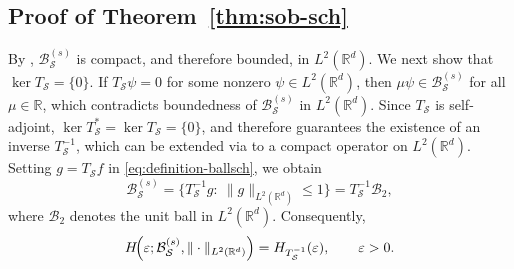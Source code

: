 \documentclass[a4paper,12pt]{article}
\let\originalleft\left
\let\originalright\right
\renewcommand{\left}{\mathopen{}\mathclose\bgroup\originalleft}
\renewcommand{\right}{\aftergroup\egroup\originalright}
\newcommand{\R}{\mathbb{R}}
\newcommand{\diff}{\mathop{}\!d}
\newcommand{\ballsch}{\mathcal{B}^{(s)}_{\mathcal{S}}}
\newcommand{\tsch}{T_{\mathcal{S}}}
\newcommand{\symbolnot}{\sigma}
\begin{document}




\subsection{Proof of Theorem~\ref{thm:sob-sch}}\label{sec:proof-thm-sob-sch}

By \cite[Proposition~25.4]{shubin_pseudodifferential_2001}, $\ballsch$ is compact,
and therefore bounded, in $L^2(\mathbb R^d)$.
We next show that $\ker \tsch=\{0\}$.
If $\tsch\psi=0$ for some nonzero $\psi\in L^2(\R^d)$, then
$\mu\psi\in\ballsch$ for all $\mu\in\R$, which contradicts boundedness of
$\ballsch$ in $L^2(\R^d)$.
Since $\tsch$ is self-adjoint, $\ker \tsch^*=\ker \tsch=\{0\}$, and
\cite[Theorem~25.4]{shubin_pseudodifferential_2001} therefore guarantees the
existence of an inverse $\tsch^{-1}$,
which can be extended via \cite[Theorem~24.4]{shubin_pseudodifferential_2001} to a compact operator 
on 
$L^2(\mathbb R^d)$.
Setting $g=\tsch f$ in \eqref{eq:definition-ballsch}, we obtain
\[
\ballsch
=
\{\tsch^{-1}g:\ \|g\|_{L^2(\mathbb R^d)}\le1\}
=
\tsch^{-1}\mathcal B_2,
\]
where $\mathcal B_2$ denotes the unit ball in $L^2(\mathbb R^d)$.
Consequently,
\begin{equation}\label{eq:equality-metric-entropy-op-entropy-sch}
H\!\left(\varepsilon;\ballsch,\|\cdot\|_{L^2(\mathbb R^d)}\right)
=
H_{\tsch^{-1}}(\varepsilon),
\qquad \varepsilon>0.
\end{equation}
\end{document}
